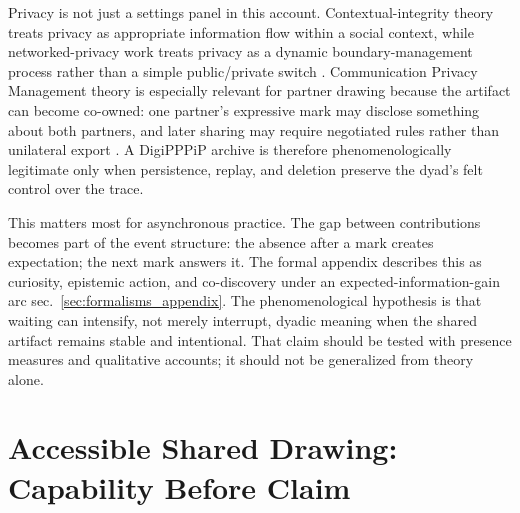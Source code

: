 \documentclass[
  english,
]{article}
\begin{document}
Privacy is not just a settings panel in this account.
Contextual-integrity theory treats privacy as appropriate information
flow within a social context, while networked-privacy work treats
privacy as a dynamic boundary-management process rather than a simple
public/private switch
\citep{nissenbaum2011contextualprivacy, palen2003privacy}. Communication
Privacy Management theory is especially relevant for partner drawing
because the artifact can become co-owned: one partner's expressive mark
may disclose something about both partners, and later sharing may
require negotiated rules rather than unilateral export
\citep{petronio2020cpm}. A DigiPPPiP archive is therefore
phenomenologically legitimate only when persistence, replay, and
deletion preserve the dyad's felt control over the trace.

This matters most for asynchronous practice. The gap between
contributions becomes part of the event structure: the absence after a
mark creates expectation; the next mark answers it. The formal appendix
describes this as curiosity, epistemic action, and co-discovery under an
expected-information-gain arc sec.~\ref{sec:formalisms_appendix}. The
phenomenological hypothesis is that waiting can intensify, not merely
interrupt, dyadic meaning when the shared artifact remains stable and
intentional. That claim should be tested with presence measures and
qualitative accounts; it should not be generalized from theory alone.

\newpage

\section{Accessible Shared Drawing: Capability Before
Claim}\label{sec:accessibility}
\end{document}
